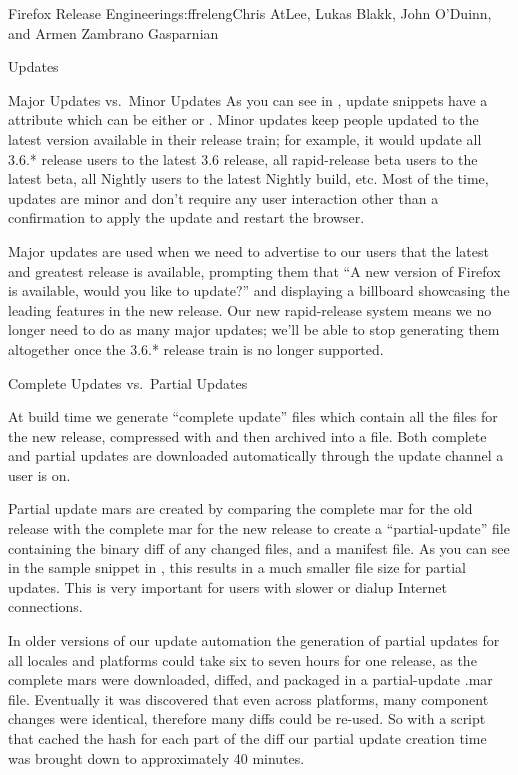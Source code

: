 \begin{aosachapter}{Firefox Release Engineering}{s:ffreleng}{Chris AtLee, Lukas Blakk, John O'Duinn, and Armen Zambrano Gasparnian}
\begin{aosasect1}{Updates}
\begin{aosasect2}{Major Updates vs.\ Minor Updates}
As you can see in , update snippets
have a  attribute which can be either  or 
.
Minor updates keep people updated to the latest version
available in their release train; for example, it would update all
3.6.* release users to the latest 3.6 release, all rapid-release beta
users to the latest beta, all Nightly users to the
latest Nightly build, etc.  Most of the time, updates are minor and
don't require any user interaction other than a confirmation to apply the
update and restart the browser.

Major updates are used when we need to advertise to our users that the
latest and greatest release is available, prompting them that
``A new version of Firefox is available, would you
like to update?'' and displaying a billboard showcasing the leading 
features in the new release.  Our new rapid-release system means we no
longer need to do as many major updates; we'll be able to stop
generating them altogether once the 3.6.* release train is no longer supported.

\end{aosasect2}

\begin{aosasect2}{Complete Updates vs.\ Partial Updates}

At build time we generate ``complete update''  files which
contain all the files for the new release, compressed with 
and then archived into a  file. Both complete and partial
updates are downloaded automatically through the update channel a user
is on.

Partial update mars are created by comparing the complete mar for the
old release with the complete mar for the new release to create a
``partial-update''  file containing the binary diff of any
changed files, and a manifest file. As you can see in the sample
snippet in , this results in a much smaller file size for partial
updates. This is very important for users with slower or
dialup Internet connections.

In older versions of our update automation the generation of partial
updates for all locales and platforms could take six to seven hours for one
release, as the complete mars were downloaded, diffed, and packaged in a
partial-update .mar file. Eventually it was discovered that even
across platforms, many component changes were identical, therefore many diffs could be re-used. So with a
script that cached the hash for each part of the diff our partial
update creation time was brought down to approximately 40 minutes. 


\end{aosasect2}
\end{aosasect1}
\end{aosachapter}
